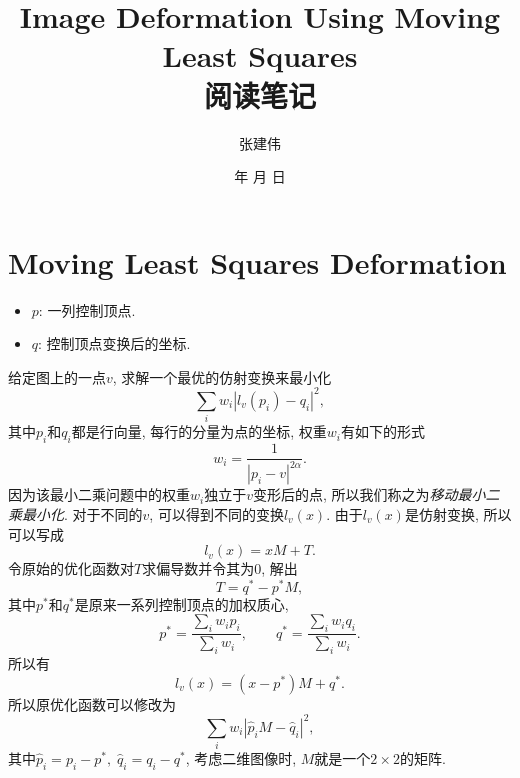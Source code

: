 \documentclass[12pt]{article}
\renewcommand{\today}{\number\year 年 \number\month 月 \number\day 日}
\begin{document}
\author{张建伟}
\date{\today}
\title{Image Deformation Using Moving Least Squares\\ 阅读笔记}
\maketitle

\section{Moving Least Squares Deformation}
\begin{itemize}
	\item $p$: 一列控制顶点.
	\item $q$: 控制顶点变换后的坐标. 
\end{itemize}
给定图上的一点$v$, 求解一个最优的仿射变换来最小化
\begin{equation}
	\sum_i w_i|l_v(p_i)-q_i|^2,
\end{equation}
其中$p_i$和$q_i$都是行向量, 每行的分量为点的坐标, 权重$w_i$有如下的形式
$$
w_i = \frac{1}{|p_i-v|^{2\alpha}}.
$$
因为该最小二乘问题中的权重$w_i$独立于$v$变形后的点, 所以我们称之为{\it 移动最小二乘最小化}. 对于不同的$v$, 可以得到不同的变换$l_v(x)$. 由于$l_v(x)$是仿射变换, 所以可以写成
\begin{equation}
	l_v(x) = xM+T.
\end{equation}
令原始的优化函数对$T$求偏导数并令其为$0$, 解出
\begin{equation*}
	T = q^* - p^*M,
\end{equation*}
其中$p^*$和$q^*$是原来一系列控制顶点的加权质心, 
\begin{equation*}
	p^* = \frac{\sum_i w_ip_i}{\sum_i w_i},\qquad 	q^* = \frac{\sum_i w_iq_i}{\sum_i w_i}.
\end{equation*}
所以有
\begin{equation}
	l_v(x) = (x-p^*)M+q^*.
\end{equation}
所以原优化函数可以修改为
\begin{equation}\label{eq01}
	\sum_i w_i|\hat{p}_iM-\hat{q}_i|^2,
\end{equation}
其中$\hat{p}_i=p_i-p^*,\;\hat{q}_i=q_i-q^*$, 考虑二维图像时, $M$就是一个$2\times2$的矩阵. 
\end{document}
